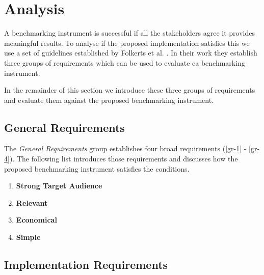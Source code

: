 \section{Analysis}
\label{sec:system:analysis}

A benchmarking instrument is successful if all the stakeholders agree it provides meaningful results. To analyse if the proposed implementation satisfies this we use a set of guidelines established by Folkerts et al. \cite{folkerts2012benchmarking}. In their work they establish three groups of requirements which can be used to evaluate ea benchmarking instrument.

In the remainder of this section we introduce these three groups of requirements and evaluate them against the proposed benchmarking instrument. 

\subsection{General Requirements}
\label{sec:system:analysis:general}

The \textit{General Requirements} group establishes four broad requirements (\ref{gr-1} - \ref{gr-4}). The following list introduces those requirements and discusses how the proposed benchmarking instrument satisfies the conditions.

\begin{enumerate}[label=\textbf{GR\arabic*}, leftmargin=3\parindent]
    \item \textbf{Strong Target Audience}
    \label{gr-1}
    

    \item \textbf{Relevant}
    \label{gr-2}
    

    \item \textbf{Economical}
    \label{gr-3}
    

    \item \textbf{Simple}
    \label{gr-4}
    
\end{enumerate}


\subsection{Implementation Requirements}
\label{sec:system:analysis:implementation}

